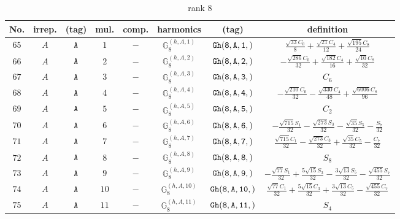 \documentclass[fleqn,8pt]{jsarticle}
\begin{document}
\begin{table}[ht!]
\begin{center}
\caption{rank 8}
\renewcommand{\arraystretch}{1.3}
\begin{tabular}{cccccccc} \hline \hline
No. & irrep. & (tag) & mul. & comp. & harmonics & (tag) & definition \\ \hline
$ 65 $ & $ A $ & $ {\tt A} $ & $ 1 $ & $ - $ & $ \mathbb{G}_{8}^{(h,A,1)} $ & $ {\tt Gh(8,A,1,)} $ & $ \frac{\sqrt{33} C_{0}}{8} + \frac{\sqrt{21} C_{4}}{12} + \frac{\sqrt{195} C_{8}}{24} $ \\
$ 66 $ & $ A $ & $ {\tt A} $ & $ 2 $ & $ - $ & $ \mathbb{G}_{8}^{(h,A,2)} $ & $ {\tt Gh(8,A,2,)} $ & $ - \frac{\sqrt{286} C_{0}}{32} + \frac{\sqrt{182} C_{4}}{16} + \frac{\sqrt{10} C_{8}}{32} $ \\
$ 67 $ & $ A $ & $ {\tt A} $ & $ 3 $ & $ - $ & $ \mathbb{G}_{8}^{(h,A,3)} $ & $ {\tt Gh(8,A,3,)} $ & $ C_{6} $ \\
$ 68 $ & $ A $ & $ {\tt A} $ & $ 4 $ & $ - $ & $ \mathbb{G}_{8}^{(h,A,4)} $ & $ {\tt Gh(8,A,4,)} $ & $ - \frac{\sqrt{210} C_{0}}{32} - \frac{\sqrt{330} C_{4}}{48} + \frac{\sqrt{6006} C_{8}}{96} $ \\
$ 69 $ & $ A $ & $ {\tt A} $ & $ 5 $ & $ - $ & $ \mathbb{G}_{8}^{(h,A,5)} $ & $ {\tt Gh(8,A,5,)} $ & $ C_{2} $ \\
$ 70 $ & $ A $ & $ {\tt A} $ & $ 6 $ & $ - $ & $ \mathbb{G}_{8}^{(h,A,6)} $ & $ {\tt Gh(8,A,6,)} $ & $ - \frac{\sqrt{715} S_{1}}{32} - \frac{\sqrt{273} S_{3}}{32} - \frac{\sqrt{35} S_{5}}{32} - \frac{S_{7}}{32} $ \\
$ 71 $ & $ A $ & $ {\tt A} $ & $ 7 $ & $ - $ & $ \mathbb{G}_{8}^{(h,A,7)} $ & $ {\tt Gh(8,A,7,)} $ & $ \frac{\sqrt{715} C_{1}}{32} - \frac{\sqrt{273} C_{3}}{32} + \frac{\sqrt{35} C_{5}}{32} - \frac{C_{7}}{32} $ \\
$ 72 $ & $ A $ & $ {\tt A} $ & $ 8 $ & $ - $ & $ \mathbb{G}_{8}^{(h,A,8)} $ & $ {\tt Gh(8,A,8,)} $ & $ S_{8} $ \\
$ 73 $ & $ A $ & $ {\tt A} $ & $ 9 $ & $ - $ & $ \mathbb{G}_{8}^{(h,A,9)} $ & $ {\tt Gh(8,A,9,)} $ & $ - \frac{\sqrt{77} S_{1}}{32} + \frac{5 \sqrt{15} S_{3}}{32} - \frac{3 \sqrt{13} S_{5}}{32} - \frac{\sqrt{455} S_{7}}{32} $ \\
$ 74 $ & $ A $ & $ {\tt A} $ & $ 10 $ & $ - $ & $ \mathbb{G}_{8}^{(h,A,10)} $ & $ {\tt Gh(8,A,10,)} $ & $ \frac{\sqrt{77} C_{1}}{32} + \frac{5 \sqrt{15} C_{3}}{32} + \frac{3 \sqrt{13} C_{5}}{32} - \frac{\sqrt{455} C_{7}}{32} $ \\
$ 75 $ & $ A $ & $ {\tt A} $ & $ 11 $ & $ - $ & $ \mathbb{G}_{8}^{(h,A,11)} $ & $ {\tt Gh(8,A,11,)} $ & $ S_{4} $ \\

\end{tabular}
\end{center}
\end{table}
\end{document}
